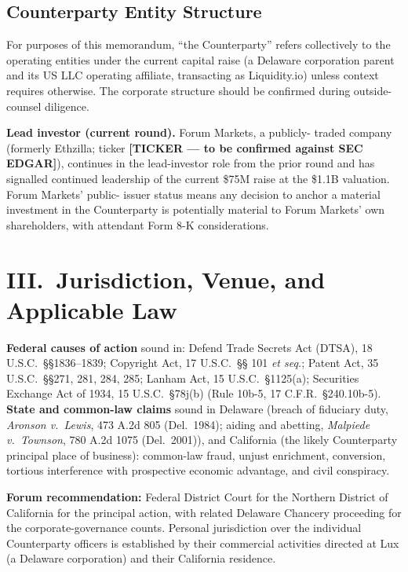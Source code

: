 \documentclass[11pt,letterpaper]{article}
\begin{document}
\subsection*{Counterparty Entity Structure}

For purposes of this memorandum, ``the Counterparty'' refers
collectively to the operating entities under the current capital
raise (a Delaware corporation parent and its US LLC operating
affiliate, transacting as Liquidity.io) unless context requires
otherwise. The corporate structure should be confirmed during
outside-counsel diligence.

\textbf{Lead investor (current round).} Forum Markets, a publicly-
traded company (formerly Ethzilla; ticker \textbf{[TICKER --- to be
confirmed against SEC EDGAR]}), continues in the lead-investor role
from the prior round and has signalled continued leadership of the
current \$75M raise at the \$1.1B valuation. Forum Markets' public-
issuer status means any decision to anchor a material investment in
the Counterparty is potentially material to Forum Markets' own
shareholders, with attendant Form 8-K considerations.

\section*{III.\ Jurisdiction, Venue, and Applicable Law}

\textbf{Federal causes of action} sound in: Defend Trade Secrets Act
(DTSA), 18 U.S.C.\ \S\S 1836--1839; Copyright Act, 17 U.S.C.\ \S\S
101 \emph{et seq.}; Patent Act, 35 U.S.C.\ \S\S 271, 281, 284, 285;
Lanham Act, 15 U.S.C.\ \S 1125(a); Securities Exchange Act of 1934,
15 U.S.C.\ \S 78j(b) (Rule 10b-5, 17 C.F.R.\ \S 240.10b-5).
\textbf{State and common-law claims} sound in Delaware (breach of
fiduciary duty, \emph{Aronson v.\ Lewis}, 473 A.2d 805 (Del.\ 1984);
aiding and abetting, \emph{Malpiede v.\ Townson}, 780 A.2d 1075
(Del.\ 2001)), and California (the likely Counterparty principal
place of business): common-law fraud, unjust enrichment, conversion,
tortious interference with prospective economic advantage, and civil
conspiracy.

\textbf{Forum recommendation:} Federal District Court for the
Northern District of California for the principal action, with
related Delaware Chancery proceeding for the corporate-governance
counts. Personal jurisdiction over the individual Counterparty
officers is established by their commercial activities directed at
Lux (a Delaware corporation) and their California residence.
\end{document}
